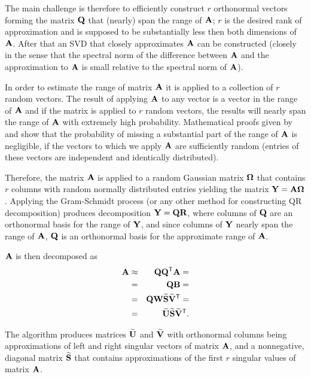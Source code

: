 The main challenge is therefore to efficiently construct $r$ orthonormal vectors forming the matrix $\mathbf{Q}$ that (nearly) span the range of $\mathbf{A}$; $r$ is the desired rank of approximation and is supposed to be substantially less then both dimensions of $\mathbf{A}$. After that an SVD that closely approximates $\mathbf{A}$ can be constructed (closely in the sense that the spectral norm of the difference between $\mathbf{A}$ and the approximation to $\mathbf{A}$ is small relative to the spectral norm of $\mathbf{A}$).

In order to estimate the range of matrix $\mathbf{A}$ it is applied to a collection of $r$ random vectors. The result of applying $\mathbf{A}$ to any vector is a vector in the range of $\mathbf{A}$ and if the matrix is applied to $r$ random vectors, the results will nearly span the range of $\mathbf{A}$ with extremely high probability. Mathematical proofs given by \cite{Halko2011} and \cite{Witten2015} show that the probability of missing a substantial part of the range of $\mathbf{A}$ is negligible, if the vectors to which we apply $\mathbf{A}$ are sufficiently random (entries of these vectors are independent and identically distributed).

Therefore, the matrix $\mathbf{A}$ is applied to a random Gaussian matrix $\mathbf{\Omega}$ that contains $r$ columns with random normally distributed entries yielding the matrix $\mathbf{Y} = \mathbf{A} \mathbf{\Omega}$. Applying the Gram-Schmidt process (or any other method for constructing QR decomposition) produces decomposition $\mathbf{Y}=\mathbf{Q}\mathbf{R}$, where columns of $\mathbf{Q}$ are an orthonormal basis for the range of $\mathbf{Y}$, and since columns of $\mathbf{Y}$ nearly span the range of $\mathbf{A}$, $\mathbf{Q}$ is an orthonormal basis for the approximate range of $\mathbf{A}$.

$\mathbf{A}$ is then decomposed as
\begin{eqnarray}
\mathbf{A} &\approx& \mathbf{Q}\mathbf{Q}^{\mathsf{T}}\mathbf{A} =
\\
&=& \mathbf{Q}\mathbf{B} = \nonumber
\\
&=& \mathbf{Q}\mathbf{W}\mathbf{\widetilde{S}}\mathbf{\widetilde{V}}^{\mathsf{T}} = \nonumber
\\
&=& \mathbf{\widetilde{U}}\mathbf{\widetilde{S}}\mathbf{\widetilde{V}}^{\mathsf{T}}. \nonumber
\end{eqnarray}

\noindent
The algorithm produces matrices $\mathbf{\widetilde{U}}$ and $\mathbf{\widetilde{V}}$ with orthonormal columns being approximations of left and right singular vectors of matrix $\mathbf{A}$, and a nonnegative, diagonal matrix $\mathbf{\widetilde{S}}$ that contains approximations of the first $r$ singular values of matrix $\mathbf{A}$.
